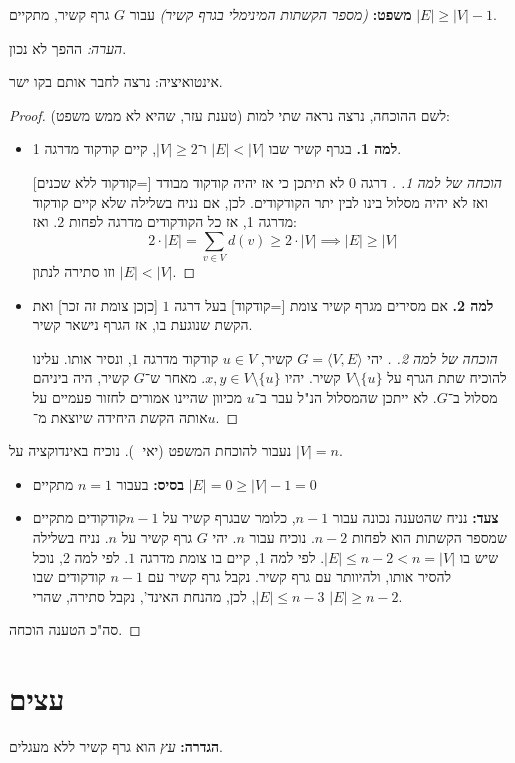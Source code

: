 \documentclass[]{article}
\newcommand\ra    {\rangle}
\newcommand\la    {\langle}
\begin{document}
	\textbf{משפט: }\textit{(מספר הקשתות המינימלי בגרף קשיר)} עבור $G$ גרף קשיר, מתקיים $|E| \ge |V| - 1$. 
	
	\textit{הערה: }ההפך לא נכון. 
	
	אינטואיציה: נרצה לחבר אותם בקו ישר. 
	
	\begin{proof}
		לשם ההוכחה, נרצה נראה שתי למות (טענת עזר, שהיא לא ממש משפט): 
		\begin{itemize}
			\item \textbf{למה 1. }בגרף קשיר שבו $|E| < |V|$ ו־$|V| \ge 2$, קיים קודקוד מדרגה 1. 
			\begin{proof}[הוכחה של למה 1. ]
				דרגה $0$ לא תיתכן כי אז יהיה קודקוד מבודד [=קודקוד ללא שכנים] ואז לא יהיה מסלול בינו לבין יתר הקודקודים. לכן, אם נניח בשלילה שלא קיים קודקוד מדרגה 1, אז כל הקודקודים מדרגה לפחות $2$. ואז: 
				 		\[ 2 \cdot |E| = \sum_{v \in V} d(v) \ge 2 \cdot |V| \implies |E| \ge |V| \]
				 		וזו סתירה לנתון $|E| < |V|$. 
			\end{proof}
			\item 		\textbf{למה 2. }אם מסירים מגרף קשיר צומת [=קודקוד] בעל דרגה $1$ [כןכן צומת זה זכר] ואת הקשת שנוגעת בו, אז הגרף נישאר קשיר. 
			\begin{proof}[הוכחה של למה 2. ]
			יהי $G = \la V, E \ra$ קשיר, $u \in V$ קודקוד מדרגה $1$, ונסיר אותו. עלינו להוכיח שתת הגרף על $V \setminus \{u\}$ קשיר. יהיו $x, y \in V \setminus \{u\}$. מאחר ש־$G$ קשיר, היה ביניהם מסלול ב־$G$. לא ייתכן שהמסלול הנ"ל עבר ב־$u$ מכיוון שהיינו אמורים לחזור פעמיים על אותה הקשת היחידה שיוצאת מ־$u$. 
			\end{proof}
		\end{itemize}
		נעבור להוכחת המשפט (יאי 🎊). נוכיח באינדוקציה על $|V| = n$. 
		\begin{itemize}
			\item \textbf{בסיס: }בעבור $n = 1$ מתקיים $|E| = 0 \ge |V| - 1 = 0$
			\item \textbf{צעד: }נניח שהטענה נכונה עבור $n - 1$, כלומר שבגרף קשיר על $n - 1 $קודקודים מתקיים שמספר הקשתות הוא לפחות $n -2$. נוכיח עבור $n$. יהי $G$ גרף קשיר על $n$. נניח בשלילה שיש בו $|E| \le n - 2 < n = |V|$. לפי למה 1, קיים בו צומת מדרגה $1$. לפי למה 2, נוכל להסיר אותו, ולהיוותר עם גרף קשיר. נקבל גרף קשיר עם $n - 1$ קודקודים שבו $|E| \le n - 3$, לכן, מהנחת האינד', נקבל סתירה, שהרי $|E| \ge n - 2$. 
		\end{itemize}		
	סה"כ הטענה הוכחה. 
	\end{proof}
	
	\section{עצים}
	\textbf{הגדרה: }\textit{עץ} הוא גרף קשיר ללא מעגלים. 
	
\end{document}
